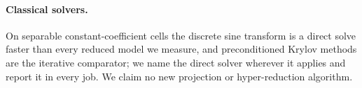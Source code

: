 \paragraph{Classical solvers.}
On separable constant-coefficient cells the discrete sine transform is a direct
solve \citep{Swarztrauber1977} faster than every reduced model we measure, and
preconditioned Krylov methods \citep{Saad2003} are the iterative comparator;
we name the direct solver wherever it applies and report it in every job. We
claim no new projection or hyper-reduction algorithm.
